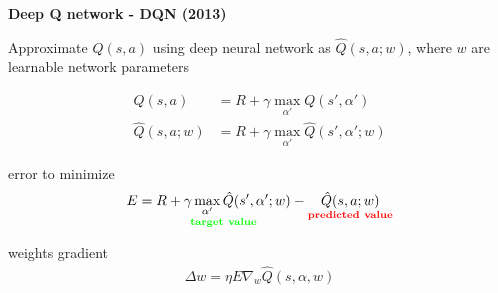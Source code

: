 \documentclass[xcolor=dvipsnames]{beamer}
\begin{document}
\begin{frame}{\bf Deep Q network - DQN (2013)}


Approximate $Q(s, a)$ using deep neural network as $\hat{Q}(s, a; w)$, where $w$ are learnable network parameters

\begin{align*}
  Q(s, a) &= R + \gamma \max \limits_{\alpha'} Q(s', \alpha') \\
  \hat{Q}(s, a; w) &= R + \gamma \max \limits_{\alpha'} \hat{Q}(s', \alpha'; w)
\end{align*}


error to minimize
\begin{align*}
  E = \underset{\bf \color{green} target\ value}{R + \gamma \max \limits_{\alpha'} \hat{Q}(s', \alpha'; w)} - \underset{\bf \color{red} predicted\ value}{\hat{Q}(s, a; w) }
\end{align*}

weights gradient
\begin{align*}
  \Delta w = \eta E \nabla _w \hat{Q}(s, \alpha, w)
\end{align*}

\end{frame}
\end{document}
